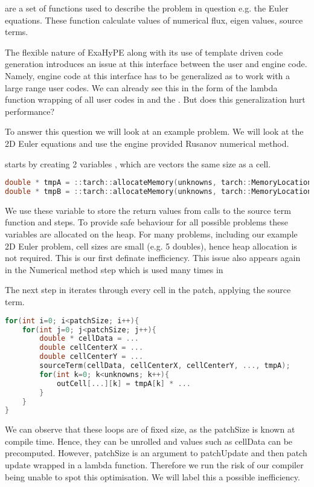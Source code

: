  are a set of functions used to describe the problem in question e.g. the Euler equations.
These function calculate values of numerical flux, eigen values, source terms.

The flexible nature of ExaHyPE along with its use of template driven code generation introduces an issue at this interface between the user and engine code.
Namely, engine code at this interface has to be generalized as to work with a large range user codes.
We can already see this in the form of the lambda function wrapping of all user codes in  and the .
But does this generalization hurt performance?

To answer this question we will look at an example problem.
We will look at the 2D Euler equations and use the engine provided Rusanov numerical method.


 starts by creating 2 variables ,  which are vectors the same size as a cell.

\begin{lstlisting}[language=c]
double * tmpA = ::tarch::allocateMemory(unknowns, tarch::MemoryLocation::Heap);
double * tmpB = ::tarch::allocateMemory(unknowns, tarch::MemoryLocation::Heap);
\end{lstlisting}

We use these variable to store the return values from calls to the source term function and  steps.
To provide safe behaviour for all possible problems these variables are allocated on the heap.
For many problems, including our example 2D Euler problem, cell sizes are small (e.g. 5 doubles), hence heap allocation is not required. 
This is our first definate inefficiency.
This issue also appears again in the Numerical method step which is used many times in 

The next step in  iterates through every cell in the patch, applying the source term.
\begin{lstlisting}[language=c]
for(int i=0; i<patchSize; i++){
    for(int j=0; j<patchSize; j++){
        double * cellData = ...
        double cellCenterX = ...
        double cellCenterY = ...    
        sourceTerm(cellData, cellCenterX, cellCenterY, ..., tmpA);
        for(int k=0; k<unknowns; k++){
            outCell[...][k] = tmpA[k] * ...
        }
    }
}
\end{lstlisting}


We can observe that these loops are of fixed size, as the patchSize is known at compile time. 
Hence, they can be unrolled and values such as cellData can be precomputed.   
However, patchSize is an argument to patchUpdate and then patch update wrapped in a lambda function.
Therefore we run the risk of our compiler being unable to spot this optimisation.
We will label this a possible inefficiency.

